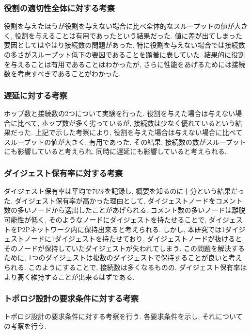 \subsubsection{役割の適切性全体に対する考察}
役割を与えたほうが役割を与えない場合に比べ全体的なスループットの値が大きく, 役割を与えることは有用であったという結果だった. 値に差が出てしまった要因としてはやはり接続数の問題があった. 特に役割を与えない場合では接続数の多さがスループット低下の要因であることを顕著に表していた. 結果的に役割を与えることは有用であることはわかったが, さらに性能をあげるためには接続数を考慮すべきであることがわかった.

\subsubsection{遅延に対する考察}
ホップ数と接続数の2つについて実験を行った. 役割を与えた場合は与えない場合に比べて, ホップ数が多く劣っているが, 接続数は少なく優れているという結果だった. 上記で示した考察により, 役割を与えた場合は与えない場合に比べてスループットの値が大きく, 有用であった. その結果, 接続数の数がスループットにも影響していると考えられ, 同時に遅延にも影響していると考えられる.

\subsubsection{ダイジェスト保有率に対する考察}
ダイジェスト保有率は平均で76\%を記録し, 概要を知るのに十分という結果だった. ダイジェスト保有率が高かった理由として, ダイジェストノードをコメント数の多いノードから選出したことがあげられる. コメント数の多いノードは離脱可能性が低く, そのようなノードにダイジェストを持たせることで, ダイジェストをP2Pネットワーク内に保持出来ると考えられる. しかし, 本研究では1ダイジェストノードに1ダイジェストを持たせており, ダイジェストノードが抜けると, そのノードが保持していたダイジェストが失われてしまう. この問題を解決するために, 1つのダイジェストは複数のダイジェストで保持することが良いと考えられる. このようにすることで, 接続数は多くなるものの, ダイジェスト保有率はより高く維持することが出来るはずである.

\subsubsection{トポロジ設計の要求条件に対する考察}
トポロジ設計の要求条件に対する考察を行う. 各要求条件を示し, それについての考察を行う.

